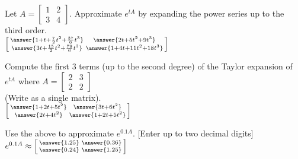 \documentclass{ximera}
\begin{document}
\begin{exercise}
    Let $A = \left[ \begin{smallmatrix}
        1 & 2 \\
        3 & 4 
    \end{smallmatrix} \right]$.
    Approximate $e^{tA}$ by expanding the power series up to the third order.\\
    $\left[\begin{smallmatrix} \answer{1 + t + \frac{7}{2}t^2 + \frac{37}{6}t^3} & \answer{2t + 5t^2 + 9t^3} \\ \answer{3t + \frac{15}{2}t^2 + \frac{79}{6}t^3} & \answer{1 + 4t + 11t^2 + 18t^3} \end{smallmatrix}\right]$
\end{exercise}

\begin{exercise}%
    Compute the first 3 terms (up to the second degree) of the Taylor expansion of $e^{tA}$ where
    $A=\left[ \begin{smallmatrix}
        2 & 3 \\
        2 & 2 
    \end{smallmatrix}\right]$ \\
    (Write as a single matrix). \\
    $\left[ \begin{smallmatrix}
        \answer{1+2t+5t^2} & \answer{3t+6t^2} \\
        \answer{2t+4t^2} & \answer{1+2t+5t^2}
    \end{smallmatrix}\right]$
    \begin{problem}
        Use the above to approximate $e^{0.1A}$. [Enter up to two decimal digits] \\
        $e^{0.1A} \approx
        \left[ \begin{smallmatrix}
            \answer{1.25} & \answer{0.36} \\
            \answer{0.24} & \answer{1.25}
        \end{smallmatrix}\right]$
    \end{problem}
\end{exercise}
\end{document}
